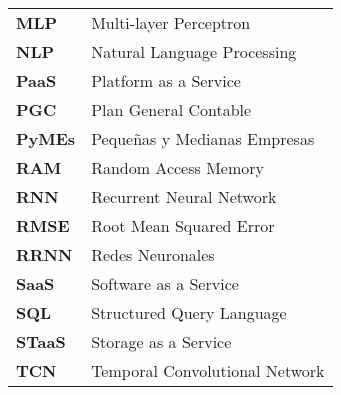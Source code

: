 \begin{longtable}{l p{13.7cm}}
	\textbf{MLP}  &  Multi-layer Perceptron  \\
	\textbf{NLP}  &  Natural Language Processing  \\
	\textbf{PaaS} &  Platform as a Service  \\
	\textbf{PGC}  &  Plan General Contable  \\
	\textbf{PyMEs} &  Pequeñas y Medianas Empresas  \\
	\textbf{RAM}  &  Random Access Memory  \\
	\textbf{RNN}  &  Recurrent Neural Network  \\
	\textbf{RMSE} &  Root Mean Squared Error  \\
	\textbf{RRNN} &  Redes Neuronales  \\
	\textbf{SaaS} &  Software as a Service  \\
	\textbf{SQL}  &  Structured Query Language  \\
	\textbf{STaaS} &  Storage as a Service  \\
	\textbf{TCN}  &  Temporal Convolutional Network  \\
\end{longtable}
